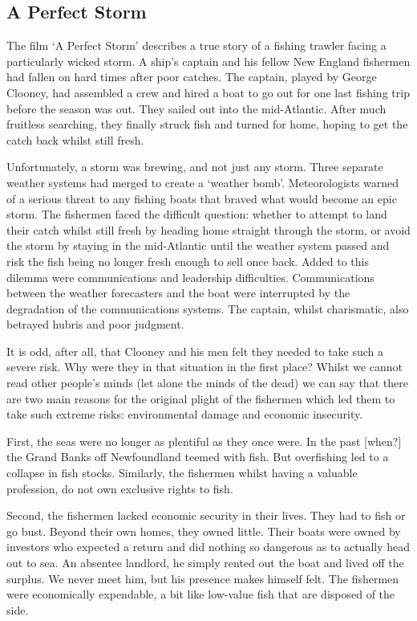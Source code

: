 \documentclass[]{tufte-handout}
\begin{document}
\hypertarget{a-perfect-storm}{%
\subsection{A Perfect Storm}\label{a-perfect-storm}}

The film `A Perfect Storm' describes a true story of a fishing trawler
facing a particularly wicked storm. A ship's captain and his fellow New
England fishermen had fallen on hard times after poor catches. The
captain, played by George Clooney, had assembled a crew and hired a boat
to go out for one last fishing trip before the season was out. They
sailed out into the mid-Atlantic. After much fruitless searching, they
finally struck fish and turned for home, hoping to get the catch back
whilst still fresh.

Unfortunately, a storm was brewing, and not just any storm. Three
separate weather systems had merged to create a `weather bomb'.
Meteorologists warned of a serious threat to any fishing boats that
braved what would become an epic storm. The fishermen faced the
difficult question: whether to attempt to land their catch whilst still
fresh by heading home straight through the storm, or avoid the storm by
staying in the mid-Atlantic until the weather system passed and risk the
fish being no longer fresh enough to sell once back. Added to this
dilemma were communications and leadership difficulties. Communications
between the weather forecasters and the boat were interrupted by the
degradation of the communications systems. The captain, whilst
charismatic, also betrayed hubris and poor judgment.

It is odd, after all, that Clooney and his men felt they needed to take
such a severe risk. Why were they in that situation in the first place?
Whilst we cannot read other people's minds (let alone the minds of the
dead) we can say that there are two main reasons for the original plight
of the fishermen which led them to take such extreme risks:
environmental damage and economic insecurity.

First, the seas were no longer as plentiful as they once were. In the
past {[}when?{]} the Grand Banks off Newfoundland teemed with fish. But
overfishing led to a collapse in fish stocks. Similarly, the fishermen
whilst having a valuable profession, do not own exclusive rights to
fish.

Second, the fishermen lacked economic security in their lives. They had
to fish or go bust. Beyond their own homes, they owned little. Their
boats were owned by investors who expected a return and did nothing so
dangerous as to actually head out to sea. An absentee landlord, he
simply rented out the boat and lived off the surplus. We never meet him,
but his presence makes himself felt. The fishermen were economically
expendable, a bit like low-value fish that are disposed of the side.
\end{document}
